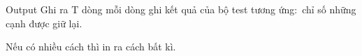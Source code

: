 Output
Ghi ra T dòng mỗi dòng ghi kết quả của bộ test tương ứng: chỉ số những cạnh được giữ lại.

Nếu có nhiều cách thì in ra cách bất kì.